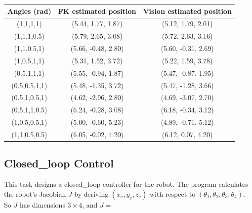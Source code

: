 \documentclass{article}
\begin{document}
\begin{center}
\begin{tabular}{c|c|c}
     Angles (rad) & FK estimated position & Vision estimated position \\ \hline
     (1,1,1,1) & (5.44, 1.77, 1.87) & (5.12, 1.79, 2.01) \\
     (1,1,1,0.5) & (5.79, 2.65, 3.08) & (5.72, 2.63, 3.16) \\
     (1,1,0.5,1) & (5.66, -0.48, 2.80) & (5.60, -0.31, 2.69) \\ 
     (1,0.5,1,1) & (5.31, 1.52, 3.72) & (5.22, 1.59, 3.78) \\ 
     (0.5,1,1,1) & (5.55, -0.94, 1.87) & (5.47, -0.87, 1.95) \\
     (0.5,0.5,1,1) & (5.48, -1.35, 3.72) & (5.47, -1.28, 3.66) \\
     (0.5,1,0.5,1) & (4.62, -2.96, 2.80) & (4.69, -3.07, 2.70) \\ 
     (0.5,1,1,0.5) & (6.24, -0.28, 3.08) & (6.18, -0.34, 3.12) \\
     (1,0.5,0.5,1) & (5.00, -0.60, 5.23) & (4.89, -0.71, 5.12) \\
     (1,1,0.5,0.5) & (6.05, -0.02, 4.20) & (6.12, 0.07, 4.20) \\
\end{tabular}
\end{center}


\subsection{Closed\_loop Control}
This task designs a closed\_loop controller for the robot. The program calculates the robot's Jacobian $J$ by deriving $(x_e, y_e, z_e)$ with respect to $(\theta_1, \theta_2, \theta_3, \theta_4)$. So $J$ has dimensions $3\times4$, and $J =$
\end{document}
